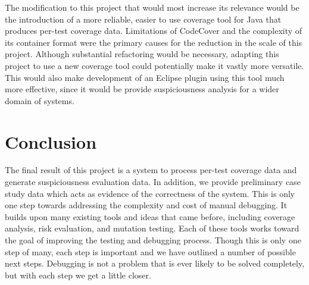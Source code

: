 The modification to this project that would most increase its relevance would be the introduction
of a more reliable, easier to use coverage tool for Java that produces per-test coverage data.
Limitations of CodeCover and the complexity of its container format were the primary causes
for the reduction in the scale of this project.  Although substantial refactoring would be
necessary, adapting this project to use a new coverage tool could potentially make it vastly 
more versatile.  This would also make development of an Eclipse plugin using this tool much
more effective, since it would be provide suspiciousness analysis for a wider domain of systems.

\section{Conclusion}\label{sec:end}

The final result of this project is a system to process per-test coverage data and generate
suspiciousness evaluation data.  In addition, we provide preliminary case study data which
acts as evidence of the correctness of the system.  This is only one step towards 
addressing the complexity and cost of manual debugging.  It builds upon many existing tools
and ideas that came before, including coverage analysis, risk evaluation, and mutation testing.
Each of these tools works toward the goal of improving the testing and debugging process.
Though this is only one step of many, each step is important and we have outlined a number
of possible next steps.  Debugging is not a problem that is ever 
likely to be solved completely, but with each step we get a little closer.  